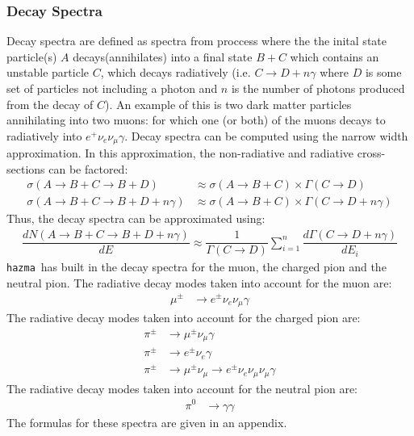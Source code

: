 \documentclass[review]{elsarticle}
\newcommand{\mil}[1]{\texttt{#1}}
\newcommand{\hazma}{\mil{hazma}}
\begin{document}
\subsubsection{Decay Spectra}

Decay spectra are defined as spectra from proccess where the the inital state particle(s) \(A\) decays(annihilates) into a final state \(B + C\) which contains an unstable particle \(C\), which decays radiatively (i.e. \(C \to D + n\gamma\) where \(D\) is some set of particles not including a photon and \(n\) is the number of photons produced from the decay of \(C\)). An example of this is two dark matter particles annihilating into two muons: for which one (or both) of the muons decays to radiatively into \(e^{+}\nu_{e}\nu_{\mu}\gamma\). Decay spectra can be computed using the narrow width approximation. In this approximation, the non-radiative and radiative cross-sections can be factored:
\begin{align}
	\sigma(A\to B + C \to B + D)           & \approx \sigma(A \to B + C)\times\Gamma(C\to D)           \\
	\sigma(A\to B + C \to B + D + n\gamma) & \approx \sigma(A \to B + C)\times\Gamma(C\to D + n\gamma)
\end{align}
Thus, the decay spectra can be approximated using:
\begin{align}
	\dfrac{dN(A\to B + C \to B + D + n\gamma)}{dE} \approx \dfrac{1}{\Gamma(C\to D)}\sum_{i=1}^{n}\dfrac{d\Gamma(C\to D + n\gamma)}{dE_{i}}
\end{align}
\hazma\ has built in the decay spectra for the muon, the charged pion and the neutral pion. The radiative decay modes taken into account for the muon are:
\begin{align}
	\mu^{\pm} & \to e^{\pm}\nu_{e}\nu_{\mu}\gamma
\end{align}
The radiative decay modes taken into account for the charged pion are:
\begin{align}
	\pi^{\pm} & \to \mu^{\pm}\nu_{\mu}\gamma                                     \\
	\pi^{\pm} & \to e^{\pm}\nu_{e}\gamma                                         \\
	\pi^{\pm} & \to \mu^{\pm}\nu_{\mu}\to e^{\pm}\nu_{e}\nu_{\mu}\nu_{\mu}\gamma
\end{align}
The radiative decay modes taken into account for the neutral pion are:
\begin{align}
	\pi^{0} & \to \gamma\gamma
\end{align}
The formulas for these spectra are given in an appendix.
\end{document}
